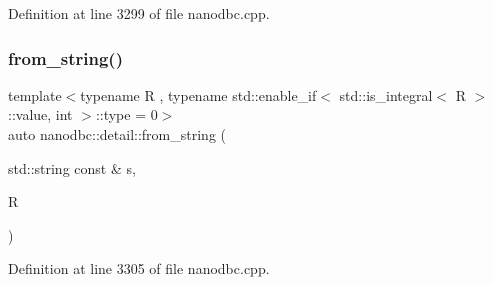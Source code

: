 Definition at line 3299 of file nanodbc.\+cpp.

\mbox{\label{namespacenanodbc_1_1detail_abda6bc1783f2b3d0a6eae7e368bf8b21}} 
\subsubsection{\texorpdfstring{from\_string()}{from\_string()}\hspace{0.1cm}{\footnotesize\ttfamily [5/5]}}
{\footnotesize\ttfamily template$<$typename R , typename std\+::enable\+\_\+if$<$ std\+::is\+\_\+integral$<$ R $>$\+::value, int $>$\+::type  = 0$>$ \\
auto nanodbc\+::detail\+::from\+\_\+string (\begin{DoxyParamCaption}\item[{std\+::string const \&}]{s,  }\item[{R}]{ }\end{DoxyParamCaption})}



Definition at line 3305 of file nanodbc.\+cpp.

